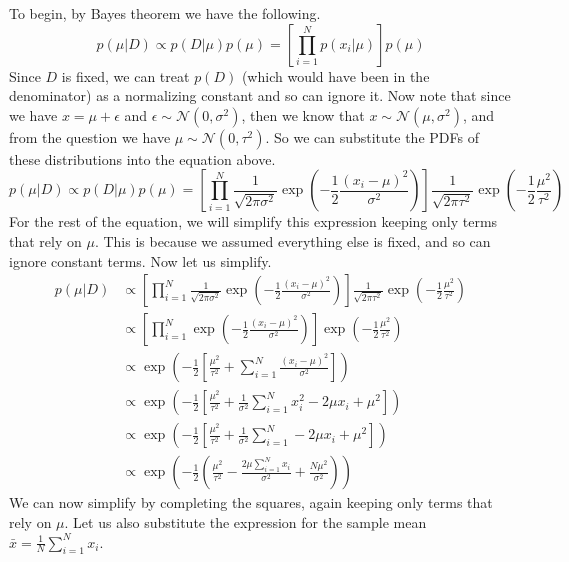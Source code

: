 \documentclass[submit]{harvardml}
\begin{document}
To begin, by Bayes theorem we have the following.
\begin{equation*}
    p(\mu | D) \propto p(D | \mu) p(\mu) = \left[ \prod_{i=1}^N p(x_i | \mu) \right] p(\mu)
\end{equation*}
Since $D$ is fixed, we can treat $p(D)$ (which would have been in the denominator) as a normalizing constant and so can ignore it. Now note that since we have $x = \mu + \epsilon$ and $\epsilon \sim \mathcal{N}(0, \sigma^2)$, then we know that $x \sim \mathcal{N}(\mu, \sigma^2)$, and from the question we have $\mu \sim \mathcal{N}(0, \tau^2)$. So we can substitute the PDFs of these distributions into the equation above.
\begin{equation*}
    p(\mu | D) \propto p(D | \mu) p(\mu) = \left[ \prod_{i=1}^N \frac{1}{\sqrt{2 \pi \sigma^2}} \exp\left(-\frac{1}{2} \frac{(x_i - \mu)^2}{\sigma^2} \right) \right] \frac{1}{\sqrt{2 \pi \tau^2}} \exp\left(-\frac{1}{2} \frac{\mu^2}{\tau^2}\right)
\end{equation*}
For the rest of the equation, we will simplify this expression keeping only terms that rely on $\mu$. This is because we assumed everything else is fixed, and so can ignore constant terms. Now let us simplify.
\begin{align*}
    p(\mu | D) &\propto \left[ \prod_{i=1}^N \frac{1}{\sqrt{2 \pi \sigma^2}} \exp\left(-\frac{1}{2} \frac{(x_i - \mu)^2}{\sigma^2} \right) \right] \frac{1}{\sqrt{2 \pi \tau^2}} \exp\left(-\frac{1}{2} \frac{\mu^2}{\tau^2}\right) \\
    &\propto \left[ \prod_{i=1}^N \exp\left(-\frac{1}{2} \frac{(x_i - \mu)^2}{\sigma^2} \right) \right] \exp\left(-\frac{1}{2} \frac{\mu^2}{\tau^2}\right) \\
    &\propto \exp\left( -\frac{1}{2} \left[ \frac{\mu^2}{\tau^2} + \sum_{i=1}^N \frac{(x_i - \mu)^2}{\sigma^2} \right] \right) \\
    &\propto \exp\left(- \frac{1}{2} \left[ \frac{\mu^2}{\tau^2} + \frac{1}{\sigma^2} \sum_{i=1}^N  x_i^2 - 2 \mu x_i + \mu^2 \right] \right)\\
    &\propto \exp\left(- \frac{1}{2} \left[ \frac{\mu^2}{\tau^2} + \frac{1}{\sigma^2} \sum_{i=1}^N - 2 \mu x_i + \mu^2 \right] \right)\\
    &\propto \exp\left(-\frac{1}{2} \left( \frac{\mu^2}{\tau^2} - \frac{2 \mu \sum_{i=1}^N x_i}{\sigma^2} + \frac{N \mu^2}{\sigma^2} \right) \right)
\end{align*}
We can now simplify by completing the squares, again keeping only terms that rely on $\mu$. Let us also substitute the expression for the sample mean $\bar{x} = \frac{1}{N} \sum_{i=1}^N x_i$.
\end{document}
